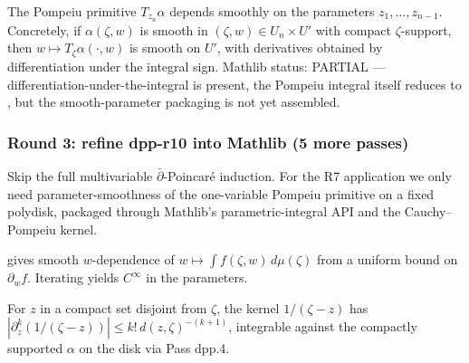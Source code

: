 \begin{lemma}
\label{lem:dpp-r10}
The Pompeiu primitive $T_{z_{n}} \alpha$ depends smoothly on the parameters $z_{1}, \ldots, z_{n-1}$.  Concretely, if $\alpha(\zeta, w)$ is smooth in $(\zeta, w) \in U_{n} \times U'$ with compact $\zeta$-support, then $w \mapsto T_{\zeta} \alpha(\cdot, w)$ is smooth on $U'$, with derivatives obtained by differentiation under the integral sign.  Mathlib status: PARTIAL --- differentiation-under-the-integral is present, the Pompeiu integral itself reduces to , but the smooth-parameter packaging is not yet assembled.
\leanok
\end{lemma}

\subsubsection*{Round 3: refine dpp-r10 into Mathlib (5 more passes)}

\begin{lemma}
\label{lem:dpp-r11}
Skip the full multivariable $\bar\partial$-Poincar\'e induction.  For the R7 application we only need parameter-smoothness of the one-variable Pompeiu primitive on a fixed polydisk, packaged through Mathlib's parametric-integral API and the Cauchy--Pompeiu kernel.
\leanok\mathlibok
\end{lemma}

\begin{lemma}
\label{lem:dpp-r12}
 gives smooth $w$-dependence of $w \mapsto \int f(\zeta, w)\,d\mu(\zeta)$ from a uniform bound on $\partial_{w} f$.  Iterating yields $C^{\infty}$ in the parameters.
\leanok\mathlibok
\end{lemma}

\begin{lemma}
\label{lem:dpp-r13}
For $z$ in a compact set disjoint from $\zeta$, the kernel $1/(\zeta - z)$ has $|\partial_{z}^{k}(1/(\zeta - z))| \leq k!\,d(z, \zeta)^{-(k+1)}$, integrable against the compactly supported $\alpha$ on the disk via Pass dpp.4.
\leanok\mathlibok
\end{lemma}

